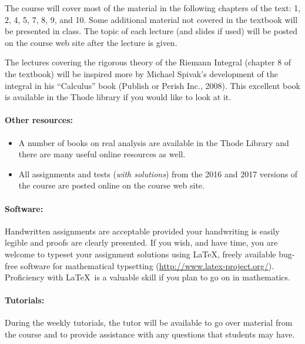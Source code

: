 \documentclass[12pt]{article}
\begin{document}
The course will cover most of the material in the following chapters of the text: 1, 2, 4, 5, 7, 8, 9, and 10.  Some additional material not covered in the textbook will be presented in class.  The topic of each lecture (and slides if used) will be posted on the course web site after the lecture is given.

The lectures covering the rigorous theory of the Riemann Integral (chapter 8 of the textbook) will be inspired more by Michael Spivak's development of the integral in his ``Calculus'' book (Publish or Perish Inc., 2008).  This excellent book is available in the Thode library if you would like to look at it.

\paragraph*{Other resources:} 
\begin{itemize}
\item A number of books on real analysis are available in the Thode Library and there are many useful online resources as well.
\item All assignments and tests (\emph{with solutions}) from the 2016
  and 2017 versions of the course are posted online on the course web site.
\end{itemize}

\paragraph*{Software:} Handwritten assignments are acceptable provided your handwriting is easily legible and proofs are clearly presented.  If you wish, and have time, you are welcome to typeset your assignment solutions using \LaTeX, freely available bug-free software for mathematical typsetting (\url{http://www.latex-project.org/}).  Proficiency with \LaTeX\ is a valuable skill if you plan to go on in mathematics.

\paragraph*{Tutorials:} During the weekly tutorials, the tutor will be available to go over material from the course and to provide assistance with any questions that students may have.
\end{document}
